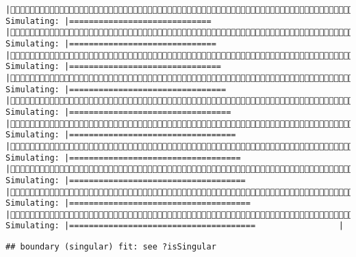 \documentclass[]{article}
\begin{document}
\begin{verbatim}
|(4/4) Simulating: |=============================                          |(4/4) Simulating: |==============================                         |(4/4) Simulating: |===============================                        |(4/4) Simulating: |================================                       |(4/4) Simulating: |=================================                      |(4/4) Simulating: |==================================                     |(4/4) Simulating: |===================================                    |(4/4) Simulating: |====================================                   |(4/4) Simulating: |=====================================                  |(4/4) Simulating: |======================================                 |
\end{verbatim}

\begin{verbatim}
## boundary (singular) fit: see ?isSingular
\end{verbatim}
\end{document}
